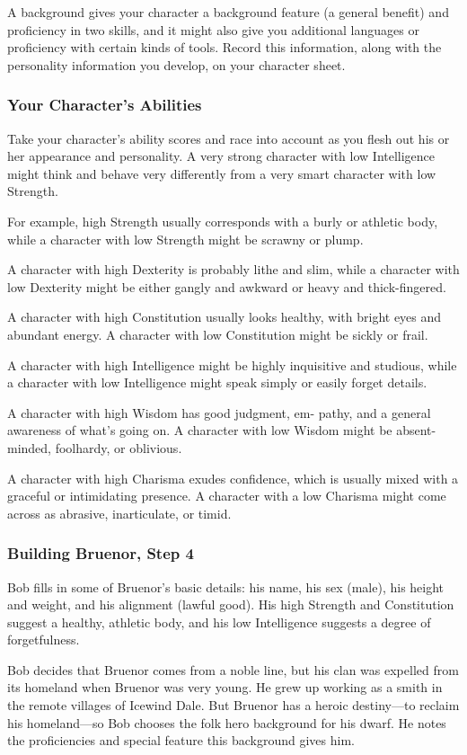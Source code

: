 A background gives your character a background feature (a general benefit) and proficiency in two skills, and it might also give you additional languages or proficiency with certain kinds of tools. Record this information, along with the personality information you develop, on your character sheet.

\subsubsection{Your Character’s Abilities}
Take your character’s ability scores and race into account as you flesh out his or her appearance and personality. A very strong character with low Intelligence might think and behave very differently from a very smart character with low Strength.

For example, high Strength usually corresponds with a burly or athletic body, while a character with low Strength might be scrawny or plump.

A character with high Dexterity is probably lithe and slim, while a character with low Dexterity might be either gangly and awkward or heavy and thick-fingered.

A character with high Constitution usually looks healthy, with bright eyes and abundant energy. A character with low Constitution might be sickly or frail.

A character with high Intelligence might be highly inquisitive and studious, while a character with low Intelligence might speak simply or easily forget details.

A character with high Wisdom has good judgment, em- pathy, and a general awareness of what’s going on. A character with low Wisdom might be absent-minded, foolhardy, or oblivious.

A character with high Charisma exudes confidence, which is usually mixed with a graceful or intimidating presence. A character with a low Charisma might come across as abrasive, inarticulate, or timid.

\subsubsection{Building Bruenor, Step 4}
Bob fills in some of Bruenor’s basic details: his name, his sex (male), his height and weight, and his alignment (lawful good). His high Strength and Constitution suggest a healthy, athletic body, and his low Intelligence suggests a degree of forgetfulness.

Bob decides that Bruenor comes from a noble line, but his clan was expelled from its homeland when Bruenor was very young. He grew up working as a smith in the remote villages of Icewind Dale. But Bruenor has a heroic destiny—to reclaim his homeland—so Bob chooses the folk hero background for his dwarf. He notes the proficiencies and special feature this background gives him.

